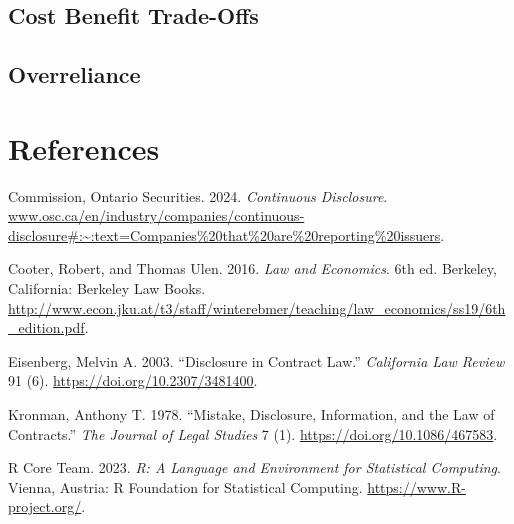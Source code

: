 \documentclass[
  12pt,
  letterpaper,
  DIV=11,
  numbers=noendperiod]{scrartcl}
\newlength{\cslhangindent}
\newlength{\cslentryspacingunit} %
\newenvironment{CSLReferences}[2] %
 {%
  \setlength{\parindent}{0pt}
  \ifodd #1
  \let\oldpar\par
  \def\par{\hangindent=\cslhangindent\oldpar}
  \fi
  \setlength{\parskip}{#2\cslentryspacingunit}
 }%
 {}
\begin{document}
\hypertarget{cost-benefit-trade-offs}{%
\subsection{Cost Benefit Trade-Offs}\label{cost-benefit-trade-offs}}

\hypertarget{overreliance}{%
\subsection{Overreliance}\label{overreliance}}

\newpage

\hypertarget{references}{%
\section*{References}\label{references}}

\hypertarget{refs}{}
\begin{CSLReferences}{1}{0}
\leavevmode{}%
Commission, Ontario Securities. 2024. \emph{Continuous Disclosure}.
\href{https://www.osc.ca/en/industry/companies/continuous-disclosure\#:~:text=Companies\%20that\%20are\%20reporting\%20issuers}{www.osc.ca/en/industry/companies/continuous-disclosure\#:\textasciitilde:text=Companies\%20that\%20are\%20reporting\%20issuers}.

\leavevmode{}%
Cooter, Robert, and Thomas Ulen. 2016. \emph{Law and Economics}. 6th ed.
Berkeley, California: Berkeley Law Books.
\url{http://www.econ.jku.at/t3/staff/winterebmer/teaching/law_economics/ss19/6th_edition.pdf}.

\leavevmode{}%
Eisenberg, Melvin A. 2003. {``Disclosure in Contract Law.''}
\emph{California Law Review} 91 (6).
\url{https://doi.org/10.2307/3481400}.

\leavevmode{}%
Kronman, Anthony T. 1978. {``Mistake, Disclosure, Information, and the
Law of Contracts.''} \emph{The Journal of Legal Studies} 7 (1).
\url{https://doi.org/10.1086/467583}.

\leavevmode{}%
R Core Team. 2023. \emph{R: A Language and Environment for Statistical
Computing}. Vienna, Austria: R Foundation for Statistical Computing.
\url{https://www.R-project.org/}.

\end{CSLReferences}
\end{document}
